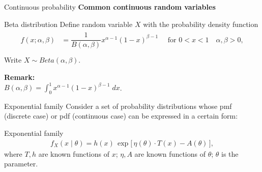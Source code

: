 \documentclass [aspectratio=169]{beamer}
\begin{document}
\begin{frame}{Continuous probability}
\textbf{Common continuous random variables}
\begin{block}{Beta distribution}
Define random variable $X$ with the probability density function
\begin{equation}
    \begin{aligned}
   {\displaystyle {\begin{aligned}f(x;\alpha ,\beta )&=\dfrac{1}{B(\alpha, \beta)}x^{\alpha-1}(1-x)^{\beta-1}\quad {\text{ for }}0 <x<1 \quad \alpha ,\beta >0,\\[6pt]\end{aligned}}}
    \end{aligned}
\end{equation}
Write $X \sim Beta(\alpha, \beta)$.
\end{block}
\vspace{0.1in}
\textbf{Remark:}\\
$B(\alpha, \beta) = \int_{0}^1 x^{\alpha - 1}(1-x)^{\beta - 1}\; dx$.
\end{frame}






\begin{frame}{Exponential family}
Consider a set of probability distributions whose pmf (discrete case) or pdf (continuous case) can be expressed in a certain form:
\begin{block}{Exponential family}
\begin{equation}
    \begin{aligned}
    {\displaystyle f_{X}(x\mid \theta )=h(x)\,\exp \!{\bigl [}\,\eta (\theta )\cdot T(x)-A(\theta )\,{\bigr ]}},
    \end{aligned}
\end{equation}
where $T,h$ are known functions of $x$; $\eta, A$ are known functions of $\theta$; $\theta$ is the parameter. 
\end{block}
\vspace{0.1in}
\end{frame}
\end{document}
